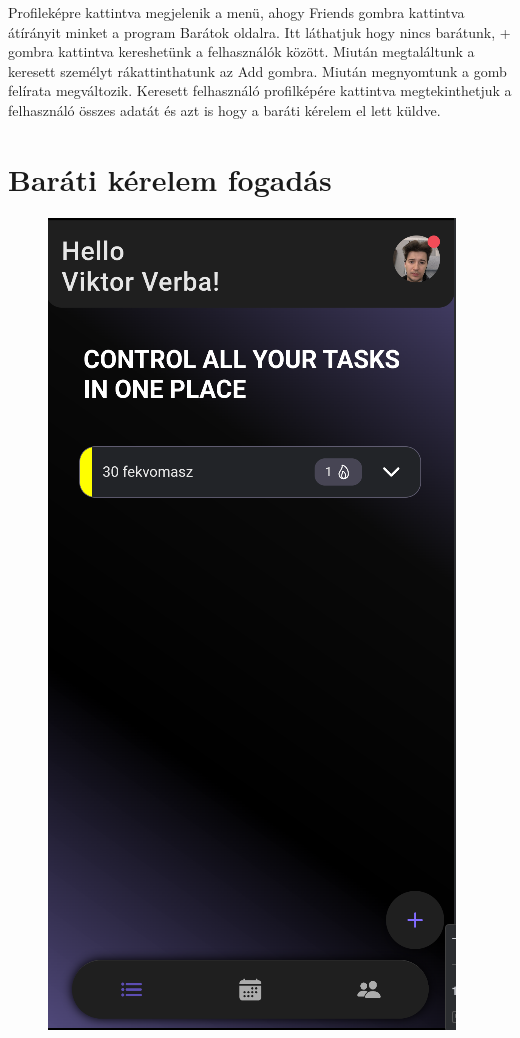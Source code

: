 \documentclass[12pt]{report}
\begin{document}
    Profileképre kattintva megjelenik a menü, ahogy Friends gombra kattintva átírányit minket a program Barátok oldalra. Itt láthatjuk hogy nincs barátunk, + gombra kattintva kereshetünk a felhasználók között. Miután megtaláltunk a keresett személyt rákattinthatunk az Add gombra.         Miután megnyomtunk a gomb felírata megváltozik. Keresett felhasználó profilképére kattintva megtekinthetjuk a felhasználó összes adatát és azt is hogy a baráti kérelem el lett küldve.

\section{Baráti kérelem fogadás}
\begin{figure}[H]
    \centering

    \begin{minipage}[t]{0.25\textwidth}
        \centering
        \includegraphics[width=\linewidth]{src/friendrequest1.png}

\end{minipage}
\end{figure}
\end{document}
